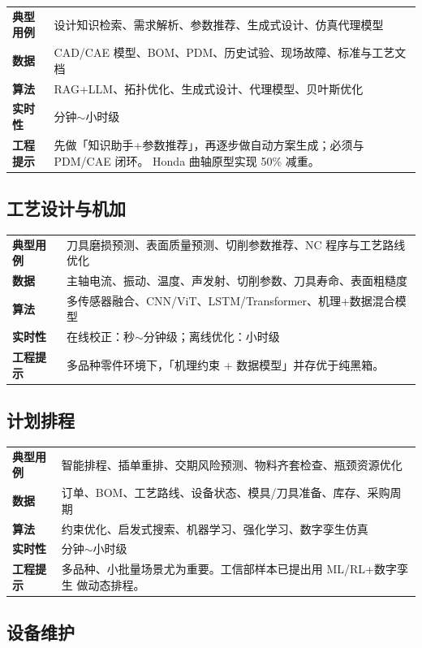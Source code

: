 \documentclass[a4paper,12pt]{ctexart}
\begin{document}
\begin{tabular}{@{}>{\bfseries}lp{11cm}@{}}
典型用例 & 设计知识检索、需求解析、参数推荐、生成式设计、仿真代理模型 \\
数据 & CAD/CAE 模型、BOM、PDM、历史试验、现场故障、标准与工艺文档 \\
算法 & RAG+LLM、拓扑优化、生成式设计、代理模型、贝叶斯优化 \\
实时性 & 分钟$\sim$小时级 \\
工程提示 & 先做「知识助手+参数推荐」，再逐步做自动方案生成；必须与 PDM/CAE 闭环。
Honda 曲轴原型实现 50\% 减重。
\end{tabular}

\subsection{工艺设计与机加}

\begin{tabular}{@{}>{\bfseries}lp{11cm}@{}}
典型用例 & 刀具磨损预测、表面质量预测、切削参数推荐、NC 程序与工艺路线优化 \\
数据 & 主轴电流、振动、温度、声发射、切削参数、刀具寿命、表面粗糙度 \\
算法 & 多传感器融合、CNN/ViT、LSTM/Transformer、机理+数据混合模型 \\
实时性 & 在线校正：秒$\sim$分钟级；离线优化：小时级 \\
工程提示 & 多品种零件环境下，「机理约束 + 数据模型」并存优于纯黑箱。
\end{tabular}

\subsection{计划排程}

\begin{tabular}{@{}>{\bfseries}lp{11cm}@{}}
典型用例 & 智能排程、插单重排、交期风险预测、物料齐套检查、瓶颈资源优化 \\
数据 & 订单、BOM、工艺路线、设备状态、模具/刀具准备、库存、采购周期 \\
算法 & 约束优化、启发式搜索、机器学习、强化学习、数字孪生仿真 \\
实时性 & 分钟$\sim$小时级 \\
工程提示 & 多品种、小批量场景尤为重要。工信部样本已提出用 ML/RL+数字孪生
做动态排程。
\end{tabular}

\subsection{设备维护}
\end{document}
